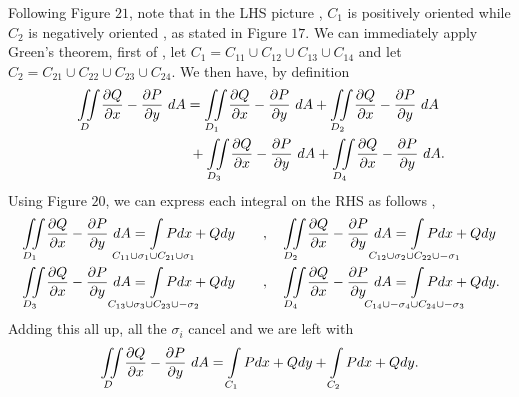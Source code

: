 \documentclass[
	12pt,
	]{article}
\theoremstyle{custom}
\theoremstyle{custom}
\theoremstyle{custom}
\theoremstyle{custom}
\theoremstyle{custom}
\theoremstyle{definition}
\theoremstyle{example}
\theoremstyle{note}
\theoremstyle{remark}
\theoremstyle{example}
\newcounter{theo}[section]\setcounter{theo}{0}
\numberwithin{equation}{subsection}
\begin{document}
  				\noindent Following Figure $21$, note that in the LHS picture , $C_{1}$ is positively oriented while $C_{2}$ is negatively oriented , as stated in Figure $17$. We can immediately apply Green's theorem, first of , let $C_{1} = C_{11} \cup C_{12} \cup C_{13} \cup C_{14}$ and let $C_{2} = C_{21} \cup C_{22} \cup C_{23} \cup C_{24}$. We then have, by definition 
  				\begin{equation*}
  				\begin{multlined}[t]
  				 \iint\limits_{D} \pdv{Q}{x} - \pdv{P}{y} \ dA =\iint\limits_{D_{1}} \pdv{Q}{x} - \pdv{P}{y} \ dA + \iint\limits_{D_{2}} \pdv{Q}{x} - \pdv{P}{y} \ dA \hspace{-0.2cm}\\+ \iint\limits_{D_{3}} \pdv{Q}{x} - \pdv{P}{y} \ dA + \iint\limits_{D_{4}} \pdv{Q}{x} - \pdv{P}{y} \ dA.
  				 \end{multlined}
  				 \end{equation*}
  				Using Figure $20$, we can express each integral on the RHS as follows ,
  				\begin{alignat*}{2}
  					&\iint\limits_{D_{1}} \pdv{Q}{x} - \pdv{P}{y} \ dA = \int\limits_{\mathclap{C_{11}\cup \sigma_{1}\cup C_{21} \cup \sigma_{1}}} Pdx + Qdy \qquad , && \iint\limits_{D_{2}} \pdv{Q}{x} - \pdv{P}{y} \ dA = \int\limits_{\mathclap{C_{12}\cup \sigma_{2} \cup C_{22}\cup -\sigma_{1}}}Pdx + Qdy \\
  					&\iint\limits_{D_{3}} \pdv{Q}{x} - \pdv{P}{y} \ dA = \int\limits_{\mathclap{C_{13}\cup \sigma_{3}\cup C_{23} \cup -\sigma_{2}}} Pdx + Qdy \qquad , && \iint\limits_{D_{4}} \pdv{Q}{x} - \pdv{P}{y} \ dA = \int\limits_{\mathclap{C_{14}\cup -\sigma_{4} \cup C_{24}\cup -\sigma_{3}}}Pdx + Qdy. 
  				\end{alignat*}
  				Adding this all up, all the $\sigma_{i}$ cancel and we are left with 
  				$$ \iint\limits_{D}\pdv{Q}{x} - \pdv{P}{y} \  dA = \int\limits_{C_{1}}Pdx + Qdy + \int\limits_{C_{2}}Pdx + Qdy.$$
  				
\end{document}

